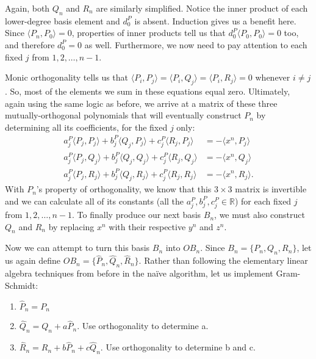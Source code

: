 \documentclass[letterpaper, 12pt]{article}
\begin{document}
\vspace*{6mm}
\noindent Again, both $Q_n$ and $R_n$ are similarly simplified. Notice the inner product of each lower-degree basis element and $d_0^P$ is absent. Induction gives us a benefit here. Since $\langle P_n, P_0\rangle = 0$, properties of inner products tell us that $d_0^P\langle P_0, P_0\rangle = 0$ too, and therefore $d_0^P = 0$ as well. Furthermore, we now need to pay attention to each fixed $j$ from $1, 2, \ldots, n-1$.

Monic orthogonality tells us that $\langle P_i, P_j\rangle = \langle P_i, Q_j\rangle = \langle P_i, R_j\rangle = 0$ whenever $i \neq j$. So, most of the elements we sum in these equations equal zero. Ultimately, again using the same logic as before, we arrive at a matrix of these three mutually-orthogonal polynomials that will eventually construct $P_n$ by determining all its coefficients, for the fixed $j$ only:
\begin{align*}
	a_j^P\langle P_j, P_j \rangle + b_j^P\langle Q_j, P_j \rangle + c_j^P\langle R_j, P_j \rangle &= - \langle x^n, P_j\rangle \\
	a_j^P\langle P_j, Q_j \rangle + b_j^P\langle Q_j, Q_j \rangle + c_j^P\langle R_j, Q_j \rangle &= - \langle x^n, Q_j\rangle \\
	a_j^P\langle P_j, R_j \rangle + b_j^P\langle Q_j, R_j \rangle + c_j^P\langle R_j, R_j \rangle&= - \langle x^n, R_j\rangle.
\end{align*}
\noindent With $P_n$'s property of orthogonality, we know that this $3\times 3$ matrix is invertible and we can calculate all of its constants (all the $a_j^P, b_j^P, c_j^P \in \mathbb{R}$) for each fixed $j$ from $1, 2,\ldots,n-1$. To finally produce our next basis $B_n$, we must also construct $Q_n$ and $R_n$ by replacing $x^n$ with their respective $y^n$ and $z^n$.

Now we can attempt to turn this basis $B_n$ into $OB_n$. Since $B_n = \{P_n, Q_n, R_n\}$, let us again define $OB_n = \{\hat{P}_n, \hat{Q}_n, \hat{R}_n\}$. Rather than following the elementary linear algebra techniques from before in the na\"ive algorithm, let us implement Gram-Schmidt:

\vspace*{-1mm}
\singlespacing
\begin{enumerate}
	\item $\hat{P}_n = P_n$
	\item $\hat{Q}_n = Q_n + a\hat{P}_n$. Use orthogonality to determine a.
	\item $\hat{R}_n = R_n + b\hat{P}_n + c\hat{Q}_n$. Use orthogonality to determine b and c.
\end{enumerate}
\end{document}
